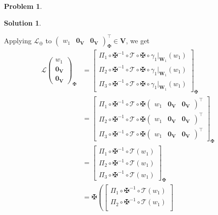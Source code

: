 \documentclass{article}
\theoremstyle{definition}
\newtheorem*{prob*}{Problem}
\newtheorem*{sln*}{Solution}
\newcommand{\V}{\mathbf{V}}
\newcommand{\W}{\mathbf{W}}
\newcommand{\lag}{\mathcal{L}}
\newcommand{\T}{\mathcal{T}}
\begin{document}
\begin{prob*}
\begin{sln*}
\begin{enumerate}
\begin{enumerate}
				Applying $\lag_\oplus$ to $\begin{pmatrix}
				w_1&\mathbf{0}_\V&\mathbf{0}_\V
				\end{pmatrix}^\top_\maltese \in \V$, we get
				\begin{align*}
				\lag\begin{pmatrix}
				w_1\\\mathbf{0}_\V\\\mathbf{0}_\V
				\end{pmatrix}_\maltese 
				&=
				\begin{bmatrix}
				\Pi_1 \circ \maltese^{-1} \circ \T \circ \maltese\circ \gamma_1\bigg\vert_{\W_1}(w_1)\\
				\Pi_2 \circ \maltese^{-1} \circ \T \circ \maltese\circ \gamma_1\bigg\vert_{\W_1}(w_1)\\
				\Pi_3 \circ \maltese^{-1} \circ \T \circ \maltese\circ \gamma_1\bigg\vert_{\W_1}(w_1)
				\end{bmatrix}_\maltese\\
				&=
				\begin{bmatrix}
				\Pi_1 \circ \maltese^{-1} \circ \T \circ \maltese
				\begin{pmatrix}
				w_1 & \mathbf{0}_\V & \mathbf{0}_\V
				\end{pmatrix}^\top\\
				\Pi_2 \circ \maltese^{-1} \circ \T \circ \maltese
				\begin{pmatrix}
				w_1 & \mathbf{0}_\V & \mathbf{0}_\V
				\end{pmatrix}^\top\\
				\Pi_3 \circ \maltese^{-1} \circ \T \circ \maltese
				\begin{pmatrix}
				w_1 & \mathbf{0}_\V & \mathbf{0}_\V
				\end{pmatrix}^\top
				\end{bmatrix}_\maltese\\
				&= 
				\begin{bmatrix}
				\Pi_1 \circ \maltese^{-1}\circ \T (w_1) \\
				\Pi_2 \circ \maltese^{-1}\circ \T (w_1) \\
				\Pi_3 \circ \maltese^{-1}\circ \T (w_1) 
				\end{bmatrix}_\maltese\\
				&=
				\maltese\left(\begin{bmatrix}
				\Pi_1 \circ \maltese^{-1}\circ \T (w_1) \\
				\Pi_2 \circ \maltese^{-1}\circ \T (w_1) \\

\end{bmatrix}
\end{align*}
\end{enumerate}
\end{enumerate}
\end{sln*}
\end{prob*}
\end{document}
